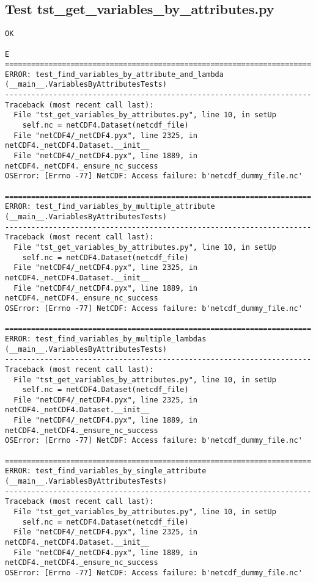 \subsection{Test tst\_get\_variables\_by\_attributes.py}

\begin{verbatim}
OK

E
======================================================================
ERROR: test_find_variables_by_attribute_and_lambda (__main__.VariablesByAttributesTests)
----------------------------------------------------------------------
Traceback (most recent call last):
  File "tst_get_variables_by_attributes.py", line 10, in setUp
    self.nc = netCDF4.Dataset(netcdf_file)
  File "netCDF4/_netCDF4.pyx", line 2325, in netCDF4._netCDF4.Dataset.__init__
  File "netCDF4/_netCDF4.pyx", line 1889, in netCDF4._netCDF4._ensure_nc_success
OSError: [Errno -77] NetCDF: Access failure: b'netcdf_dummy_file.nc'

======================================================================
ERROR: test_find_variables_by_multiple_attribute (__main__.VariablesByAttributesTests)
----------------------------------------------------------------------
Traceback (most recent call last):
  File "tst_get_variables_by_attributes.py", line 10, in setUp
    self.nc = netCDF4.Dataset(netcdf_file)
  File "netCDF4/_netCDF4.pyx", line 2325, in netCDF4._netCDF4.Dataset.__init__
  File "netCDF4/_netCDF4.pyx", line 1889, in netCDF4._netCDF4._ensure_nc_success
OSError: [Errno -77] NetCDF: Access failure: b'netcdf_dummy_file.nc'

======================================================================
ERROR: test_find_variables_by_multiple_lambdas (__main__.VariablesByAttributesTests)
----------------------------------------------------------------------
Traceback (most recent call last):
  File "tst_get_variables_by_attributes.py", line 10, in setUp
    self.nc = netCDF4.Dataset(netcdf_file)
  File "netCDF4/_netCDF4.pyx", line 2325, in netCDF4._netCDF4.Dataset.__init__
  File "netCDF4/_netCDF4.pyx", line 1889, in netCDF4._netCDF4._ensure_nc_success
OSError: [Errno -77] NetCDF: Access failure: b'netcdf_dummy_file.nc'

======================================================================
ERROR: test_find_variables_by_single_attribute (__main__.VariablesByAttributesTests)
----------------------------------------------------------------------
Traceback (most recent call last):
  File "tst_get_variables_by_attributes.py", line 10, in setUp
    self.nc = netCDF4.Dataset(netcdf_file)
  File "netCDF4/_netCDF4.pyx", line 2325, in netCDF4._netCDF4.Dataset.__init__
  File "netCDF4/_netCDF4.pyx", line 1889, in netCDF4._netCDF4._ensure_nc_success
OSError: [Errno -77] NetCDF: Access failure: b'netcdf_dummy_file.nc'


\end{verbatim}
